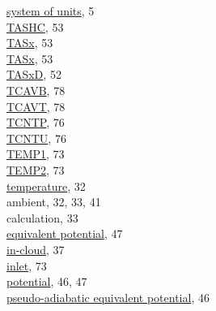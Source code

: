 \documentclass[
  english,
]{book}
\begin{document}
\href{./2-general-information-about-data-files.html\#units-and-abbreviations}{system
of units}, 5\\
\href{./4-the-state-of-the-atmosphere.html\#tashc}{TASHC}, 53\\
\href{./4-the-state-of-the-atmosphere.html\#true-airspeed\%7C}{TASx},
53\\
\href{./4-the-state-of-the-atmosphere.html\#true-airspeed}{TASx}, 53\\
\href{./4-the-state-of-the-atmosphere.html\#true-airspeed}{TASxD}, 52\\
\href{./8-radiation-variables.html\#rstx}{TCAVB}, 78\\
\href{./8-radiation-variables.html\#rstx}{TCAVT}, 78\\
\href{./7-aerosol-particle-measurements.html\#tcntu-tcntp}{TCNTP}, 76\\
\href{./7-aerosol-particle-measurements.html\#tcntu-tcntp}{TCNTU}, 76\\
\href{./7-aerosol-particle-measurements.html\#cntemp}{TEMP1}, 73\\
\href{./7-aerosol-particle-measurements.html\#cntemp}{TEMP2}, 73\\
\href{./4-the-state-of-the-atmosphere.html\#ambient-t}{temperature},
32\\
\hspace*{0.333em}\hspace*{0.333em}ambient, 32, 33, 41\\
\hspace*{0.333em}\hspace*{0.333em}calculation, 33\\
\hspace*{0.333em}\hspace*{0.333em}\href{./4-the-state-of-the-atmosphere.html\#thetae}{equivalent
potential}, 47\\
\hspace*{0.333em}\hspace*{0.333em}\href{./4-the-state-of-the-atmosphere.html\#AT-ITR}{in-cloud},
37\\
\hspace*{0.333em}\hspace*{0.333em}\href{./7-aerosol-particle-measurements.html\#cntemp}{inlet},
73\\
\hspace*{0.333em}\hspace*{0.333em}\href{./4-the-state-of-the-atmosphere.html\#theta}{potential},
46, 47\\
\hspace*{0.333em}\hspace*{0.333em}\href{./4-the-state-of-the-atmosphere.html\#thetae}{pseudo-adiabatic
equivalent potential}, 46\\
\end{document}
